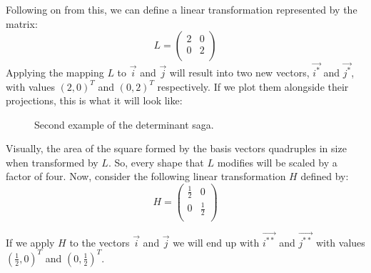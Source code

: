 \documentclass[600paper, 11pt,twoside,openany]{kdp}
\begin{document}
\par 
\vspace{-3pt}
\indent Following on from this, we can define a linear transformation represented by the matrix:
\[
L = \begin{pmatrix}
2 & 0   \\
0 & 2 \\
\end{pmatrix}
\]
\indent Applying the mapping $L$ to $\overrightarrow{i}$ and $\overrightarrow{j}$ will result into two new vectors, $\overrightarrow{i^*}$ and $\overrightarrow{j^*}$, with values $(2,0)^T$ and $(0,2)^T$ respectively. If we plot them alongside their projections, this is what it will look like:
\newpage
\begin{figure}[h!]
\begin{center}
\end{center}
\caption{Second example of the determinant saga.}
\end{figure}

\indent Visually, the area of the square formed by the basis vectors quadruples in size when transformed by $L$. So, every shape that $L$ modifies will be scaled by a factor of four. Now, consider the following linear transformation $H$ defined by:
\[
 H = \begin{pmatrix}
\frac{1}{2} & 0   \\
0 & \frac{1}{2} \\
\end{pmatrix}
\]
\par 
\vspace{-3pt}
\indent If we apply $H$ to the vectors $\overrightarrow{i}$ and $\overrightarrow{j}$ we will end up with $\overrightarrow{i^{**}}$ and $\overrightarrow{j^{**}}$ with values $(\frac{1}{2},0)^T$ and $(0,\frac{1}{2})^T$.
\end{document}
